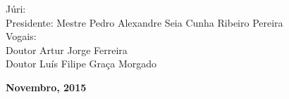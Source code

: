 \begin{titlepage}
\begin{center}
\begin{tabbing}
		\end{tabbing}
		\begin{tabbing}
		   \fontsize{12pt}{10pt}\selectfont
		   Júri: \\
		   \fontsize{11pt}{10pt}\selectfont
		   \hspace{1.1cm}Presidente: Mestre Pedro Alexandre Seia Cunha Ribeiro Pereira \\
		   \fontsize{11pt}{10pt}\selectfont
		   \hspace{1.1cm}Vogais: \\
		   \fontsize{11pt}{10pt}\selectfont
		   \hspace{2.2cm}Doutor Artur Jorge Ferreira \\
		   \fontsize{11pt}{10pt}\selectfont
		   \hspace{2.2cm}Doutor Luís Filipe Graça Morgado\\
		\end{tabbing}
		
		\fontsize{10pt}{10pt}\selectfont
		\textbf{Novembro, 2015}
	\end{center}

	\newpage
	\thispagestyle{empty}
	\cleardoublepage
	\newpage
	\thispagestyle{empty}
	

\end{titlepage}

